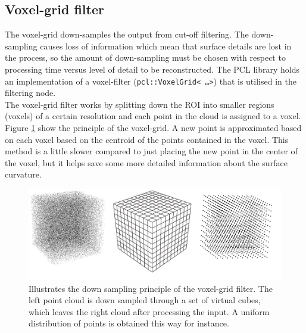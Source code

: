 \subsection{Voxel-grid filter}
The voxel-grid down-samples the output from cut-off filtering. The down-sampling causes loss of information which mean that surface details are lost in the process, so the amount of down-sampling must be chosen with respect to processing time versus level of detail to be reconstructed. The PCL library holds an implementation of a voxel-filter (\texttt{pcl::VoxelGrid< \ldots >}) that is utilised in the filtering node.\\

The voxel-grid filter works by splitting down the ROI into smaller regions (voxels) of a certain resolution and each point in the cloud is assigned to a voxel. Figure \ref{fig:filtering_voxel_grid} show the principle of the voxel-grid. A new point is approximated based on each voxel based on the centroid of the points contained in the voxel. This method is a little slower compared to just placing the new point in the center of the voxel, but it helps save some more detailed information about the surface curvature.
\begin{figure}[htb]
	\begin{center}
		\includegraphics[scale=0.4,trim=0 0 0 0]{graphics/07_modelling/voxelgrid.png}%
		\caption{Illustrates the down sampling principle of the voxel-grid filter. The left point cloud is down sampled through a set of virtual cubes, which leaves the right cloud after processing the input. A uniform distribution of points is obtained this way for instance.}
		\label{fig:filtering_voxel_grid}
	\end{center}
\end{figure}

